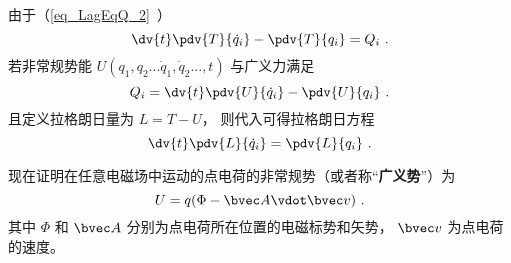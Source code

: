 
\begin{issues}
\issueDraft
\end{issues}


由于（\autoref{eq_LagEqQ_2}~）
\begin{equation}
\dv{t}\pdv{T}{\dot q_i} - \pdv{T}{q_i} = Q_i~.
\end{equation}
若非常规势能  $U(q_1, q_2...\dot q_1, \dot q_2..., t)$ 与广义力满足
\begin{equation}\label{eq_EMLagP_2}
Q_i = \dv{t} \pdv{U}{\dot q_i} - \pdv{U}{q_i}~.
\end{equation}
且定义拉格朗日量为 $L = T - U$， 则代入可得拉格朗日方程
\begin{equation}
\dv{t} \pdv{L}{\dot q_i} = \pdv{L}{q_i}~.
\end{equation}

现在证明在任意电磁场中运动的点电荷的非常规势（或者称“\textbf{广义势}”）为
\begin{equation}\label{eq_EMLagP_4}
U = q(\Phi  - \bvec A \vdot \bvec v)~.
\end{equation}
其中 $\Phi$ 和 $\bvec A$ 分别为点电荷所在位置的电磁标势和矢势， $\bvec v$ 为点电荷的速度。

